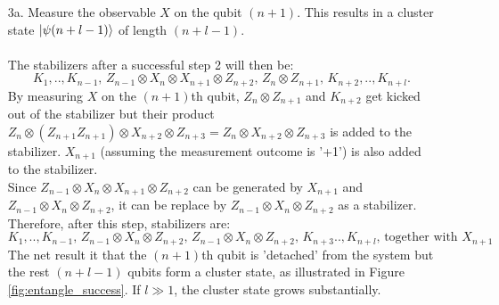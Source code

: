 \documentclass[letterpaper,10pt]{article}
\begin{document}
\begin{enumerate}
	\item[3a.]
	Measure the observable $X$ on the qubit $(n + 1)$. This results in a cluster state $\Ket{\psi(n+l-1)}$ of length $(n+l-1)$. \\ \\
	The stabilizers after a successful step 2 will then be:
	\begin{equation}
		K_1,..,K_{n-1},\,Z_{n-1}\otimes X_n\otimes X_{n+1}\otimes Z_{n+2},\, Z_n\otimes Z_{n+1}, \,K_{n+2},..,K_{n+l}.
	\end{equation}
	By measuring $X$ on the $(n+1)$th qubit, $Z_n\otimes Z_{n+1}$ and $K_{n+2}$ get kicked out of the stabilizer but their product $Z_n\otimes (Z_{n+1}Z_{n+1})\otimes X_{n+2}\otimes Z_{n+3}=Z_n\otimes X_{n+2}\otimes Z_{n+3}$ is added to the stabilizer. $X_{n+1}$ (assuming the measurement outcome is '+1') is also added to the stabilizer.\\
	Since $Z_{n-1}\otimes X_n\otimes X_{n+1}\otimes Z_{n+2}$ can be generated by $X_{n+1}$ and $Z_{n-1}\otimes X_n\otimes Z_{n+2}$, it can be replace by $Z_{n-1}\otimes X_n\otimes Z_{n+2}$ as a stabilizer.\\
	Therefore, after this step, stabilizers are:
	\begin{equation}
		K_1,..,K_{n-1},\,Z_{n-1}\otimes X_n\otimes Z_{n+2},\,Z_{n-1}\otimes X_n\otimes Z_{n+2},\,K_{n+3}..,K_{n+l}, \,\textrm{together with} \,\,X_{n+1}
	\end{equation}
	The net result it that the $(n+1)$th qubit is 'detached' from the system but the rest $(n+l-1)$ qubits form a cluster state, as illustrated in Figure \ref{fig:entangle_success}. If $l\gg 1$, the cluster state grows substantially.
	

\end{enumerate}
\end{document}
